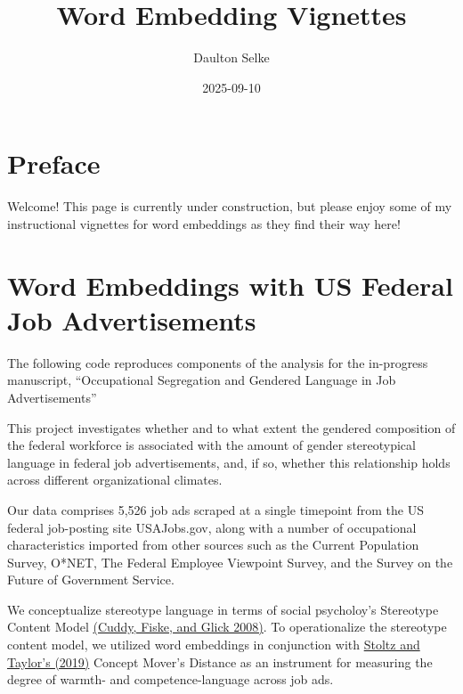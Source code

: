 \documentclass[
  letterpaper,
  DIV=11,
  numbers=noendperiod]{scrreprt}
\title{Word Embedding Vignettes}
\author{Daulton Selke}
\date{2025-09-10}
\renewcommand*\contentsname{Table of contents}
\newcommand\contentsname{Table of contents}
\begin{document}
\maketitle

\renewcommand*\contentsname{Table of contents}
{
\hypersetup{linkcolor=}
\setcounter{tocdepth}{2}
\tableofcontents
}


\chapter*{Preface}\label{preface}


Welcome! This page is currently under construction, but please enjoy
some of my instructional vignettes for word embeddings as they find
their way here!


\chapter{Word Embeddings with US Federal Job
Advertisements}\label{word-embeddings-with-us-federal-job-advertisements}

The following code reproduces components of the analysis for the
in-progress manuscript, ``Occupational Segregation and Gendered Language
in Job Advertisements''

This project investigates whether and to what extent the gendered
composition of the federal workforce is associated with the amount of
gender stereotypical language in federal job advertisements, and, if so,
whether this relationship holds across different organizational
climates.

Our data comprises 5,526 job ads scraped at a single timepoint from the
US federal job-posting site USAJobs.gov, along with a number of
occupational characteristics imported from other sources such as the
Current Population Survey, O*NET, The Federal Employee Viewpoint Survey,
and the Survey on the Future of Government Service.

We conceptualize stereotype language in terms of social psycholoy's
Stereotype Content Model
\href{https://www.sciencedirect.com/science/article/pii/S0065260107000020?casa_token=HABSzi8Y7JMAAAAA:LBi45HX4KWxLfP4LLjsP8ySkpW1JtcZBNl67r55dZjmKbzsggVNarS--N6Y9XWdcn_q3zGfTI_c}{(Cuddy,
Fiske, and Glick 2008)}. To operationalize the stereotype content model,
we utilized word embeddings in conjunction with
\href{https://link.springer.com/article/10.1007/s42001-019-00048-6}{Stoltz
and Taylor's (2019)} Concept Mover's Distance as an instrument for
measuring the degree of warmth- and competence-language across job ads.
\end{document}
